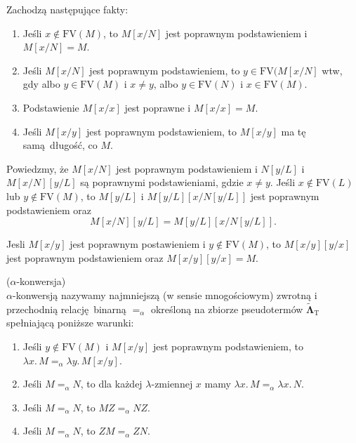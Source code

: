 \noindent Zachodzą następujące fakty:
    \begin{fakt}
      \begin{enumerate}[label=({\alph*})]
        \item Jeśli \(x\not\in\mathrm{FV}(M)\), to \(M[x/N]\) jest poprawnym podstawieniem i \(M[x/N]=M\).
        \item Jeśli \(M[x/N]\) jest poprawnym podstawieniem, to \(y\in\mathrm{FV}(M[x/N]\) wtw, gdy albo \(y\in\mathrm{FV}(M)\)
          i \(x\neq y\), albo \(y\in \mathrm{FV}(N)\) i \(x\in \mathrm{FV}(M)\). 
        \item Podstawienie \(M[x/x]\) jest poprawne i \(M[x/x]=M\).
        \item Jeśli \(M[x/y]\) jest poprawnym podstawieniem, to \(M[x/y]\) ma tę samą długość, co \(M\).
      \end{enumerate}
    \end{fakt}
    \begin{fakt}
      Powiedzmy, że \(M[x/N]\) jest poprawnym podstawieniem i \(N[y/L]\) i \(M[x/N][y/L]\) są poprawnymi podstawieniami, gdzie
      \(x\neq y\). Jeśli \(x\not\in \mathrm{FV}(L)\) lub \(y\not\in\mathrm{FV}(M)\), to \(M[y/L]\) i \( M[y/L]\left[x/N[y/L]\right] \) jest poprawnym podstawieniem oraz
      \[
        M[x/N][y/L]=M[y/L][x/N[y/L]].
      \]
    \end{fakt}

    \begin{fakt}
      Jesli \(M[x/y]\) jest poprawnym postawieniem i \(y\not\in\mathrm{FV}(M)\), to \(M[x/y][y/x]\) jest poprawnym podstawieniem oraz
      \(M[x/y][y/x]=M\).
    \end{fakt}
    
  \begin{definicja}(\(\alpha\)-konwersja)\\
    \(\alpha\)-konwersją nazywamy najmniejszą (w sensie mnogościowym) zwrotną i przechodnią relację binarną \(=_\alpha\) określoną na zbiorze pseudotermów \(\mathbf{\tilde{\Lambda}}_{\mathrm{T}}\) spełniającą poniższe warunki:
    \begin{enumerate}[label=({\alph*})]
      \item Jeśli \(y\not\in \mathrm{FV}(M)\) i \(M[x/y]\) jest poprawnym podstawieniem, to \(\lambda x.\, M  =_\alpha \lambda y.\, M[x/y]\).
      \item Jeśli \(M=_\alpha N\), to dla każdej \(\lambda\)-zmiennej \(x\) mamy \(\lambda x.\, M =_\alpha \lambda x.\,N\).
      \item Jeśli \(M=_\alpha N\), to \(M Z=_\alpha N Z\).
      \item Jeśli \(M=_\alpha N\), to \(ZM =_\alpha ZN\).
    \end{enumerate}
  \end{definicja}

